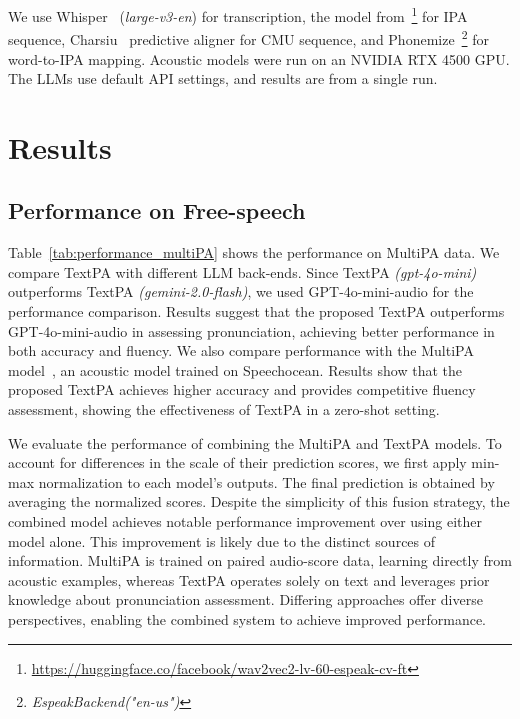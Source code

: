 \documentclass[11pt]{article}
\begin{document}
We use Whisper~\cite{radford2023robust} (\textit{large-v3-en}) for transcription, the model from~\cite{xu2021simple}\footnote{\url{https://huggingface.co/facebook/wav2vec2-lv-60-espeak-cv-ft}} for IPA sequence, Charsiu~\cite{zhu2022phone} predictive aligner for CMU sequence, and Phonemize~\cite{Bernard2021}\footnote{\textit{EspeakBackend("en-us")}} for word-to-IPA mapping. Acoustic models were run on an NVIDIA RTX 4500 GPU. The LLMs use default API settings, and results are from a single run.



\section{Results}


\subsection{Performance on Free-speech}
\label{sec:performance_on_free_speech}

Table~\ref{tab:performance_multiPA} shows the performance on MultiPA data. We compare TextPA with different LLM back-ends. Since TextPA \textit{(gpt-4o-mini)} outperforms TextPA \textit{(gemini-2.0-flash)}, we used GPT-4o-mini-audio for the performance comparison. Results suggest that the proposed TextPA outperforms GPT-4o-mini-audio in assessing pronunciation, achieving better performance in both accuracy and fluency. We also compare performance with the MultiPA model~\cite{chen2023multipa}, an acoustic model trained on Speechocean. Results show that the proposed TextPA achieves higher accuracy and provides competitive fluency assessment, showing the effectiveness of TextPA in a zero-shot setting. 

We evaluate the performance of combining the MultiPA and TextPA models. To account for differences in the scale of their prediction scores, we first apply min-max normalization to each model's outputs. The final prediction is obtained by averaging the normalized scores. Despite the simplicity of this fusion strategy, the combined model achieves notable performance improvement over using either model alone. This improvement is likely due to the distinct sources of information. MultiPA is trained on paired audio-score data, learning directly from acoustic examples, whereas TextPA operates solely on text and leverages prior knowledge about pronunciation assessment. Differing approaches offer diverse perspectives, enabling the combined system to achieve improved performance.
\end{document}
